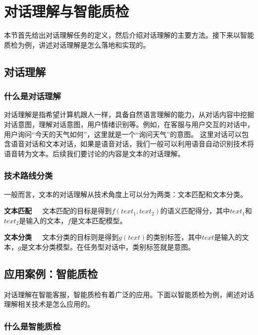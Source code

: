 %
%
%
\chapter{对话理解与智能质检}
\label{basic} %
本节首先给出对话理解任务的定义，然后介绍对话理解的主要方法。接下来以智能质检为例，讲述对话理解是怎么落地和实现的。
\section{对话理解}
\subsection{什么是对话理解}
对话理解是指希望计算机跟人一样，具备自然语言理解的能力，从对话内容中挖掘对话意图，理解对话意图，用户情绪识别等。例如，在客服与用户交互的对话中，用户询问“今天的天气如何”，这里就是一个“询问天气”的意图。
这里对话可以包含语音对话和文本对话，如果是语音对话，我们一般可以利用语音自动识别技术将语音转为文本。后续我们要讨论的内容是文本的对话理解。
\subsection{技术路线分类}
一般而言，文本的对话理解从技术角度上可以分为两类：文本匹配和文本分类。

\textbf{文本匹配}~~~文本匹配的目标是得到$f(text_1, text_2)$的语义匹配得分，其中$text_1$和$text_2$是输入的文本，$f$是文本匹配模型。

\textbf{文本分类}~~~文本分类的目标则是得到${g(text)}$的类别标签，其中$text$是输入的文本，$g$是文本分类模型。在任务型对话中，类别标签就是意图。

\section{应用案例：智能质检}
对话理解在智能客服，智能质检有着广泛的应用。下面以智能质检为例，阐述对话理解相关技术是怎么应用的。
\subsection{什么是智能质检}

